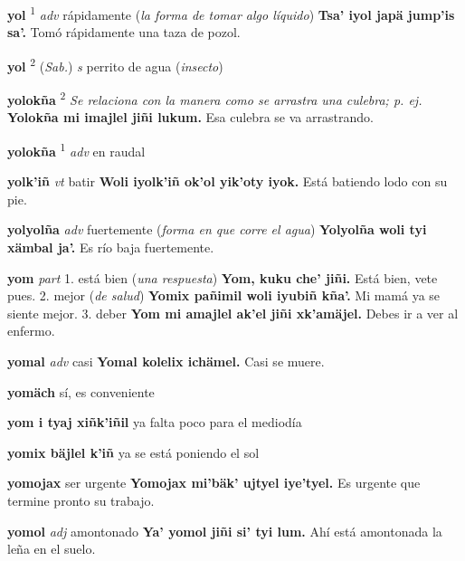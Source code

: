 \documentclass[10pt]{scrbook}
\newcommand{\entry}[1]{\textbf{#1}}
\newcommand{\onedefinition}[1]{#1.}
\newcommand{\defsuperscript}[1]{\textsuperscript{#1}}
\newcommand{\nontranslationdef}[1]{\textit{#1}}
\newcommand{\partofspeech}[1]{\textit{#1}}
\newcommand{\spanishtranslation}[1]{#1}
\newcommand{\clarification}[1]{(\textit{#1})}
\newcommand{\cholexample}[1]{\textbf{#1}}
\newcommand{\exampletranslation}[1]{#1}
\newcommand{\relevantdialect}[1]{(\textit{#1})}
\begin{document}
\begin{multicols}{2}
\entry{yol}
\defsuperscript{1}
\partofspeech{adv}
\spanishtranslation{rápidamente}
\clarification{la forma de tomar algo líquido}
\cholexample{Tsa' iyol japä jump'is sa'.}
\exampletranslation{Tomó rápidamente una taza de pozol.}

\entry{yol}
\defsuperscript{2}
\relevantdialect{Sab.}
\partofspeech{s}
\spanishtranslation{perrito de agua}
\clarification{insecto}

\entry{yolokña}
\defsuperscript{2}
\nontranslationdef{Se relaciona con la manera como se arrastra una culebra; p. ej.}
\cholexample{Yolokña mi imajlel jiñi lukum.}
\exampletranslation{Esa culebra se va arrastrando.}

\entry{yolokña}
\defsuperscript{1}
\partofspeech{adv}
\spanishtranslation{en raudal}

\entry{yolk'iñ}
\partofspeech{vt}
\spanishtranslation{batir}
\cholexample{Woli iyolk'iñ ok'ol yik'oty iyok.}
\exampletranslation{Está batiendo lodo con su pie.}

\entry{yolyolña}
\partofspeech{adv}
\spanishtranslation{fuertemente}
\clarification{forma en que corre el agua}
\cholexample{Yolyolña woli tyi xämbal ja'.}
\exampletranslation{Es río baja fuertemente.}

\entry{yom}
\partofspeech{part}
\onedefinition{1}
\spanishtranslation{está bien}
\clarification{una respuesta}
\cholexample{Yom, kuku che' jiñi.}
\exampletranslation{Está bien, vete pues.}
\onedefinition{2}
\spanishtranslation{mejor}
\clarification{de salud}
\cholexample{Yomix pañimil woli iyubiñ kña'.}
\exampletranslation{Mi mamá ya se siente mejor.}
\onedefinition{3}
\spanishtranslation{deber}
\cholexample{Yom mi amajlel ak'el jiñi xk'amäjel.}
\exampletranslation{Debes ir a ver al enfermo.}

\entry{yomal}
\partofspeech{adv}
\spanishtranslation{casi}
\cholexample{Yomal kolelix ichämel.}
\exampletranslation{Casi se muere.}

\entry{yomäch}
\spanishtranslation{sí, es conveniente}

\entry{yom i tyaj xiñk'iñil}
\spanishtranslation{ya falta poco para el mediodía}

\entry{yomix bäjlel k'iñ}
\spanishtranslation{ya se está poniendo el sol}

\entry{yomojax}
\spanishtranslation{ser urgente}
\cholexample{Yomojax mi'bäk' ujtyel iye'tyel.}
\exampletranslation{Es urgente que termine pronto su trabajo.}

\entry{yomol}
\partofspeech{adj}
\spanishtranslation{amontonado}
\cholexample{Ya' yomol jiñi si' tyi lum.}
\exampletranslation{Ahí está amontonada la leña en el suelo.}


\end{multicols}
\end{document}
